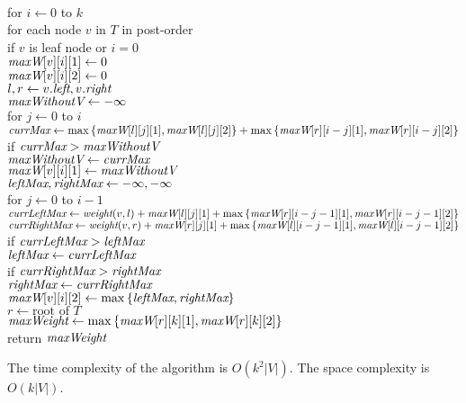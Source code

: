 \documentclass[11pt]{article}
\begin{document}
\begin{solution}
\begin{enumerate}[(a)]
\begin{algo}
\\	for $i\gets 0$ to $k$\+
\\	for each node $v$ in $T$ in post-order\+
\\	if $v$ is leaf node or $i=0$\+
\\	$\emph{maxW}[v][i][1]\gets 0$
\\	$\emph{maxW}[v][i][2]\gets 0$\-
\\	$l,r\gets v.\emph{left}, v.\emph{right}$
\\	$\emph{maxWithoutV}\gets -\infty$
\\	for $j\gets 0$ to $i$\+
\\	$\emph{currMax}\gets \max{\{\emph{maxW}[l][j][1],\emph{maxW}[l][j][2]\}}+\max{\{\emph{maxW}[r][i-j][1],\emph{maxW}[r][i-j][2]\}}$
\\	if $\emph{currMax}>\emph{maxWithoutV}$\+
\\	$\emph{maxWithoutV}\gets \emph{currMax}$\-\-
\\	$\emph{maxW}[v][i][1]\gets \emph{maxWithoutV}$
\\	$\emph{leftMax}, \emph{rightMax}\gets -\infty, -\infty$
\\	for $j\gets 0$ to $i-1$\+
\\	$\emph{currLeftMax}\gets \emph{weight}(v,l)+\emph{maxW}[l][j][1]+\max{\{\emph{maxW}[r][i-j-1][1],\emph{maxW}[r][i-j-1][2]\}}$
\\	$\emph{currRightMax}\gets \emph{weight}(v,r)+\emph{maxW}[r][j][1]+\max{\{\emph{maxW}[l][i-j-1][1],\emph{maxW}[l][i-j-1][2]\}}$
\\	if $\emph{currLeftMax}>\emph{leftMax}$\+
\\	$\emph{leftMax}\gets \emph{currLeftMax}$\-
\\	if $\emph{currRightMax}>\emph{rightMax}$\+
\\	$\emph{rightMax}\gets \emph{currRightMax}$\-\-
\\	$\emph{maxW}[v][i][2]\gets \max{\{\emph{leftMax}, \emph{rightMax}\}}$\-\-
\\	$r\gets \text{root of $T$}$
\\	$\emph{maxWeight}\gets \max{\{\emph{maxW}[r][k][1], \emph{maxW}[r][k][2]\}}$
\\	return $\emph{maxWeight}$\-
\end{algo}
The time complexity of the algorithm is $O(k^2|V|)$. The space complexity is $O(k|V|)$.
\end{enumerate}
\end{solution}
\end{document}
